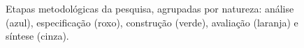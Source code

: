 \begin{figure}[htbp]
\caption{Etapas metodológicas da pesquisa, agrupadas por natureza: análise (azul), especificação (roxo), construção (verde), avaliação (laranja) e síntese (cinza).}
\label{fig:metodologia}
\end{figure}